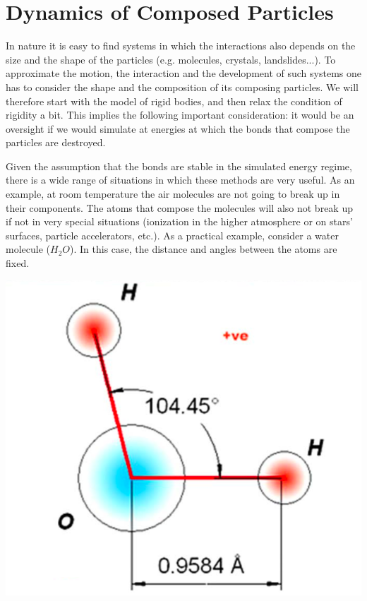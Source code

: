 

\section{Dynamics of Composed Particles}


In nature it is easy to find systems in which the interactions also depends on the size and the shape of the particles (e.g. molecules, crystals, landslides...). To approximate the motion, the interaction and the development of such systems one has to consider the shape and the composition of its composing particles. We will therefore start with the model of rigid bodies, and then relax the condition of rigidity a bit. This implies the following important consideration: it would be an oversight if we would simulate at energies at which the bonds that compose the particles are destroyed. 


\vspace{0.1cm}
\noindent
\begin{minipage}{\textwidth}
\begin{minipage}{.6\textwidth}%
Given the assumption that the bonds are stable in the simulated energy regime, there is a wide range of situations in which these methods are very useful. As an example, at room temperature the  air molecules are not going to break up in their components. The atoms that compose the molecules will also not break up if not in very special situations (ionization in the higher atmosphere or on stars' surfaces, particle accelerators, etc.). As a practical example, consider a water molecule ($H_2O$). In this case, the distance and angles between the atoms are fixed.
 \end{minipage}%
\hfill
\begin{minipage}{.4\textwidth}%
  \centering
  \includegraphics[width=\textwidth]{pics/water}
  \label{fig:water}
\end{minipage}
\end{minipage}
\vspace{0.1cm}

